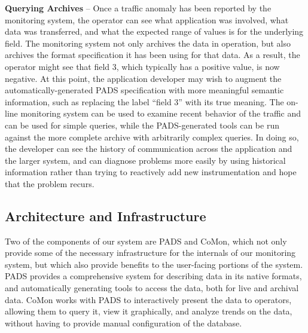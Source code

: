 {\bf Querying Archives} -- Once a traffic anomaly has been reported by
the monitoring system, the operator can see what application was
involved, what data was transferred, and what the expected range of
values is for the underlying field. The monitoring system not only
archives the data in operation, but also archives the format
specification it has been using for that data. As a result, the
operator might see that field 3, which typically has a positive value,
is now negative. At this point, the application developer may wish to
augment the automatically-generated PADS specification with more
meaningful semantic information, such as replacing the label ``field
3'' with its true meaning. The on-line monitoring system can be used
to examine recent behavior of the traffic and can be used for simple
queries, while the PADS-generated tools can be run against the more
complete archive with arbitrarily complex queries. In doing so, the
developer can see the history of communication across the application
and the larger system, and can diagnose problems more easily by using
historical information rather than trying to reactively add new
instrumentation and hope that the problem recurs.

\subsection{Architecture and Infrastructure}


Two of the components of our system are PADS and CoMon, which not only
provide some of the necessary infrastructure for the internals of our
monitoring system, but which also provide benefits to the user-facing
portions of the system.  PADS provides a comprehensive system for
describing data in its native formats, and automatically generating
tools to access the data, both for live and archival data. CoMon works
with PADS to interactively present the data to operators, allowing
them to query it, view it graphically, and analyze trends on the data,
without having to provide manual configuration of the database.

